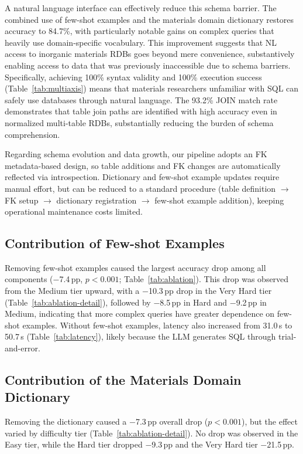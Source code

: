 \documentclass{npj-compt.mater}
\begin{document}
A natural language interface can effectively reduce this schema
barrier.
The combined use of few-shot examples and the materials domain
dictionary restores accuracy to 84.7\%, with particularly notable
gains on complex queries that heavily use domain-specific
vocabulary.
This improvement suggests that NL access to inorganic materials
RDBs goes beyond mere convenience, substantively enabling access
to data that was previously inaccessible due to schema barriers.
Specifically, achieving 100\% syntax validity and 100\% execution
success (Table~\ref{tab:multiaxis}) means that materials
researchers unfamiliar with SQL can safely use databases through
natural language.
The 93.2\% JOIN match rate demonstrates that table join paths are
identified with high accuracy even in normalized multi-table RDBs,
substantially reducing the burden of schema comprehension.

Regarding schema evolution and data growth, our pipeline adopts
an FK metadata-based design, so table additions and FK changes
are automatically reflected via introspection.
Dictionary and few-shot example updates require manual effort,
but can be reduced to a standard procedure
(table definition $\to$ FK setup $\to$ dictionary registration
$\to$ few-shot example addition), keeping operational maintenance
costs limited.

\subsection{Contribution of Few-shot Examples}

Removing few-shot examples caused the largest accuracy drop
among all components ($-$7.4\,pp, $p<0.001$;
Table~\ref{tab:ablation}).
This drop was observed from the Medium tier upward, with a
$-$10.3\,pp drop in the Very Hard tier
(Table~\ref{tab:ablation-detail}), followed by $-$8.5\,pp in
Hard and $-$9.2\,pp in Medium, indicating that more complex
queries have greater dependence on few-shot examples.
Without few-shot examples, latency also increased from 31.0\,s
to 50.7\,s (Table~\ref{tab:latency}), likely because the LLM
generates SQL through trial-and-error.

\subsection{Contribution of the Materials Domain Dictionary}

Removing the dictionary caused a $-$7.3\,pp overall drop
($p<0.001$), but the effect varied by difficulty tier
(Table~\ref{tab:ablation-detail}).
No drop was observed in the Easy tier, while the Hard tier
dropped $-$9.3\,pp and the Very Hard tier $-$21.5\,pp.
\end{document}
